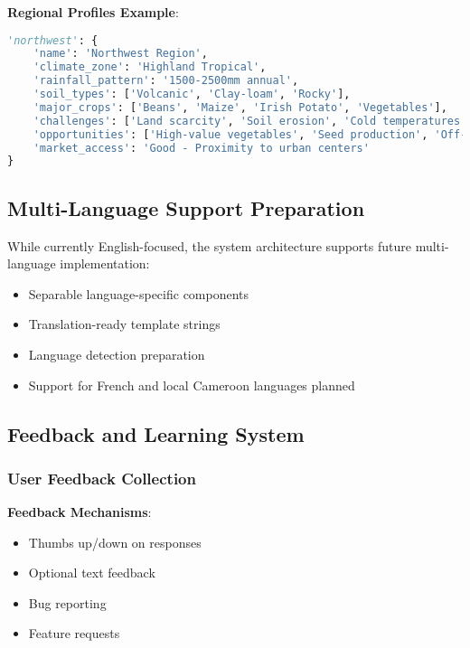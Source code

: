 \documentclass[12pt,a4paper]{article}
\begin{document}
\textbf{Regional Profiles Example}:
\begin{lstlisting}[language=Python, caption=Regional Profile Structure]
'northwest': {
    'name': 'Northwest Region',
    'climate_zone': 'Highland Tropical',
    'rainfall_pattern': '1500-2500mm annual',
    'soil_types': ['Volcanic', 'Clay-loam', 'Rocky'],
    'major_crops': ['Beans', 'Maize', 'Irish Potato', 'Vegetables'],
    'challenges': ['Land scarcity', 'Soil erosion', 'Cold temperatures'],
    'opportunities': ['High-value vegetables', 'Seed production', 'Off-season farming'],
    'market_access': 'Good - Proximity to urban centers'
}
\end{lstlisting}

\subsection{Multi-Language Support Preparation}

While currently English-focused, the system architecture supports future multi-language implementation:

\begin{itemize}[leftmargin=*]
    \item Separable language-specific components
    \item Translation-ready template strings
    \item Language detection preparation
    \item Support for French and local Cameroon languages planned
\end{itemize}

\subsection{Feedback and Learning System}

\subsubsection{User Feedback Collection}

\textbf{Feedback Mechanisms}:
\begin{itemize}[leftmargin=*]
    \item Thumbs up/down on responses
    \item Optional text feedback
    \item Bug reporting
    \item Feature requests
\end{itemize}
\end{document}
